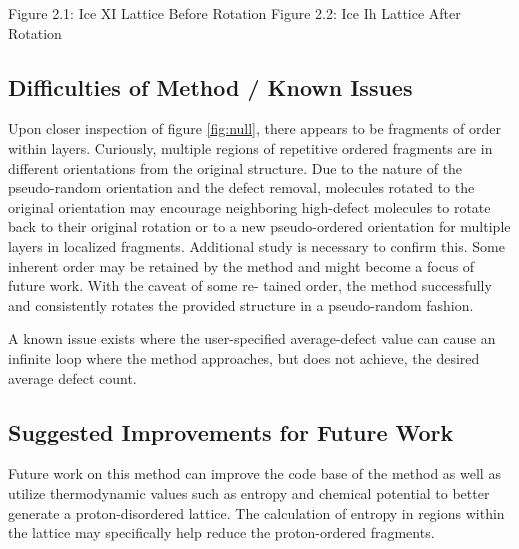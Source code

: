 Figure 2.1: Ice XI Lattice Before Rotation
Figure 2.2: Ice Ih Lattice After Rotation

\subsection{Difficulties of Method / Known Issues}
Upon closer inspection of figure \ref{fig:null}, there appears to be fragments of order within layers. 
Curiously, multiple regions of repetitive ordered fragments are in different orientations from the original structure. 
Due to the nature of the pseudo-random orientation and the defect removal, molecules rotated to the original orientation may encourage neighboring high-defect molecules to rotate back to their original rotation or to a new pseudo-ordered orientation for multiple layers in localized fragments. 
Additional study is necessary to confirm this. 
Some inherent order may be retained by the method and might become a focus of future work. 
With the caveat of some re- tained order, the method successfully and consistently rotates the provided structure in a pseudo-random fashion.

A known issue exists where the user-specified average-defect value can cause an infinite loop where the method approaches, but does not achieve, the desired average defect count.
\subsection{Suggested Improvements for Future Work}
Future work on this method can improve the code base of the method as well as utilize thermodynamic values such as entropy and chemical potential to better generate a proton-disordered lattice. 
The calculation of entropy in regions within the lattice may specifically help reduce the proton-ordered fragments.







